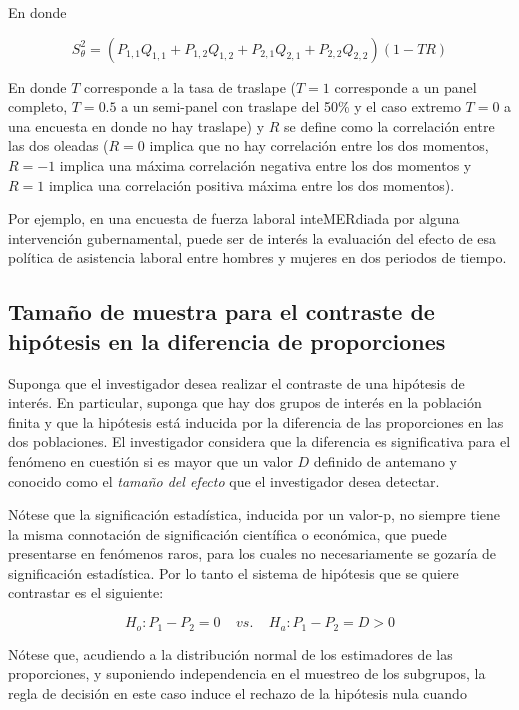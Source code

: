 \documentclass[
  12pt,
  spanish,
]{book}
\begin{document}
En donde

\[
S^2_{\theta} = (P_{1,1}Q_{1,1}+P_{1,2}Q_{1,2}+P_{2,1}Q_{2,1}+P_{2,2}Q_{2,2})(1-TR)
\]

En donde \(T\) corresponde a la tasa de traslape (\(T=1\) corresponde a un panel completo, \(T=0.5\) a un semi-panel con traslape del 50\% y el caso extremo \(T=0\) a una encuesta en donde no hay traslape) y \(R\) se define como la correlación entre las dos oleadas (\(R=0\) implica que no hay correlación entre los dos momentos, \(R=-1\) implica una máxima correlación negativa entre los dos momentos y \(R=1\) implica una correlación positiva máxima entre los dos momentos).

Por ejemplo, en una encuesta de fuerza laboral inteMERdiada por alguna intervención gubernamental, puede ser de interés la evaluación del efecto de esa política de asistencia laboral entre hombres y mujeres en dos periodos de tiempo.

\hypertarget{tamauxf1o-de-muestra-para-el-contraste-de-hipuxf3tesis-en-la-diferencia-de-proporciones}{%
\subsection{Tamaño de muestra para el contraste de hipótesis en la diferencia de proporciones}\label{tamauxf1o-de-muestra-para-el-contraste-de-hipuxf3tesis-en-la-diferencia-de-proporciones}}

Suponga que el investigador desea realizar el contraste de una hipótesis de interés. En particular, suponga que hay dos grupos de interés en la población finita y que la hipótesis está inducida por la diferencia de las proporciones en las dos poblaciones. El investigador considera que la diferencia es significativa para el fenómeno en cuestión si es mayor que un valor \(D\) definido de antemano y conocido como el \emph{tamaño del efecto} que el investigador desea detectar.

Nótese que la significación estadística, inducida por un valor-p, no siempre tiene la misma connotación de significación científica o económica, que puede presentarse en fenómenos raros, para los cuales no necesariamente se gozaría de significación estadística. Por lo tanto el sistema de hipótesis que se quiere contrastar es el siguiente:

\[
H_o: P_1-P_2=0 \ \ \ \ \ vs.  \ \ \ \ \ H_a: P_1 -P_2 =D > 0 
\]

Nótese que, acudiendo a la distribución normal de los estimadores de las proporciones, y suponiendo independencia en el muestreo de los subgrupos, la regla de decisión en este caso induce el rechazo de la hipótesis nula cuando
\end{document}

